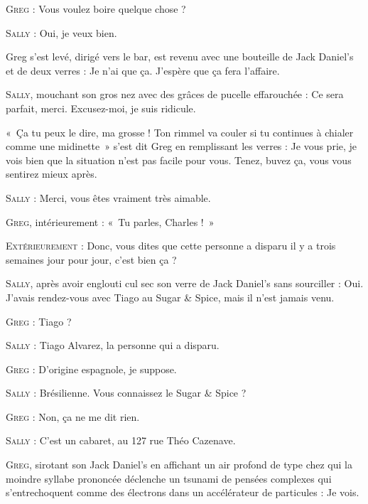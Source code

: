 \begin{dialogue}
\textsc{Greg} : Vous voulez boire quelque chose ?

\textsc{Sally} : Oui, je veux bien.

%
%
%
Greg s’est levé, dirigé vers le bar, est revenu avec une bouteille de Jack Daniel’s et de deux verres : Je n’ai que ça. J’espère que ça fera l’affaire.

\textsc{Sally}, mouchant son gros nez avec des grâces de pucelle effarouchée : Ce sera parfait, merci. Excusez-moi, je suis ridicule.

«~Ça tu peux le dire, ma grosse ! Ton rimmel va couler si tu continues à chialer comme une midinette~» s’est dit Greg en remplissant les verres : Je vous prie, je vois bien que la situation n’est pas facile pour vous. Tenez, buvez ça, vous vous sentirez mieux après.

\textsc{Sally} : Merci, vous êtes vraiment très aimable.

\textsc{Greg}, intérieurement : «~Tu parles, Charles !~»

\textsc{Extérieurement} : Donc, vous dites que cette personne a disparu il y a trois semaines jour pour jour, c’est bien ça ?

\textsc{Sally}, après avoir englouti cul sec son verre de Jack Daniel’s sans sourciller : Oui. J’avais rendez-vous avec Tiago au Sugar \& Spice, mais il n’est jamais venu.

\textsc{Greg} : Tiago ?

\textsc{Sally} : Tiago Alvarez, la personne qui a disparu.

\textsc{Greg} : D’origine espagnole, je suppose.

\textsc{Sally} : Brésilienne. Vous connaissez le Sugar \& Spice ?

\textsc{Greg} : Non, ça ne me dit rien.

\textsc{Sally} : C’est un cabaret, au 127 rue Théo Cazenave.

\textsc{Greg}, sirotant son Jack Daniel’s en affichant un air profond de type chez qui la moindre syllabe prononcée déclenche un tsunami de pensées complexes qui s’entrechoquent comme des électrons dans un accélérateur de particules : Je vois.

\end{dialogue}

